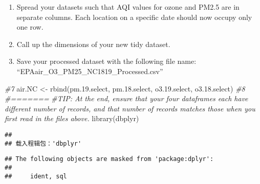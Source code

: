 \documentclass[
]{article}
\newenvironment{Shaded}{\begin{snugshade}}{\end{snugshade}}
\newcommand{\CommentTok}[1]{\textcolor[rgb]{0.56,0.35,0.01}{\textit{#1}}}
\newcommand{\FloatTok}[1]{\textcolor[rgb]{0.00,0.00,0.81}{#1}}
\newcommand{\FunctionTok}[1]{\textcolor[rgb]{0.00,0.00,0.00}{#1}}
\newcommand{\NormalTok}[1]{#1}
\newcommand{\OtherTok}[1]{\textcolor[rgb]{0.56,0.35,0.01}{#1}}
\providecommand{\tightlist}{%
  \setlength{\itemsep}{0pt}\setlength{\parskip}{0pt}}
\begin{document}
\begin{enumerate}
\def\labelenumi{\arabic{enumi}.}
\setcounter{enumi}{8}
\tightlist
\item
  Spread your datasets such that AQI values for ozone and PM2.5 are in
  separate columns. Each location on a specific date should now occupy
  only one row.
\item
  Call up the dimensions of your new tidy dataset.
\item
  Save your processed dataset with the following file name:
  ``EPAair\_O3\_PM25\_NC1819\_Processed.csv''
\end{enumerate}

\begin{Shaded}
\begin{Highlighting}[]
\CommentTok{\#7}
\NormalTok{air.NC }\OtherTok{\textless{}{-}} \FunctionTok{rbind}\NormalTok{(pm.}\FloatTok{19.}\NormalTok{select, pm.}\FloatTok{18.}\NormalTok{select, o3.}\FloatTok{19.}\NormalTok{select, o3.}\FloatTok{18.}\NormalTok{select)}
\CommentTok{\#8}
\CommentTok{\#=======}
\CommentTok{\#TIP: At the end, ensure that your four dataframes each have different number of records, and that number of records matches those when you first read in the files above. }
\FunctionTok{library}\NormalTok{(dbplyr)}
\end{Highlighting}
\end{Shaded}

\begin{verbatim}
## 
## 载入程辑包：'dbplyr'
\end{verbatim}

\begin{verbatim}
## The following objects are masked from 'package:dplyr':
## 
##     ident, sql
\end{verbatim}
\end{document}
